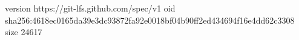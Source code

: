 version https://git-lfs.github.com/spec/v1
oid sha256:4618ec0165da39e3dc93872fa92e0018bf04b90ff2ed434694f16e4dd62c3308
size 24617
